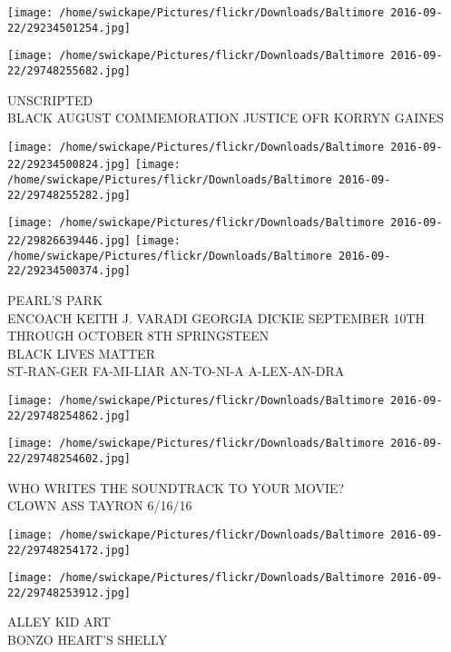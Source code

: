 \documentclass[10pt,letterpaper]{article}
\begin{document}
\texttt{[image: /home/swickape/Pictures/flickr/Downloads/Baltimore 2016-09-22/29234501254.jpg]}

\vspace{0.25in}
\texttt{[image: /home/swickape/Pictures/flickr/Downloads/Baltimore 2016-09-22/29748255682.jpg]}

UNSCRIPTED\\
BLACK AUGUST COMMEMORATION JUSTICE OFR KORRYN GAINES\\
\pagebreak

\texttt{[image: /home/swickape/Pictures/flickr/Downloads/Baltimore 2016-09-22/29234500824.jpg]}
\texttt{[image: /home/swickape/Pictures/flickr/Downloads/Baltimore 2016-09-22/29748255282.jpg]}

\texttt{[image: /home/swickape/Pictures/flickr/Downloads/Baltimore 2016-09-22/29826639446.jpg]}
\texttt{[image: /home/swickape/Pictures/flickr/Downloads/Baltimore 2016-09-22/29234500374.jpg]}

PEARL'S PARK\\
ENCOACH KEITH J. VARADI GEORGIA DICKIE SEPTEMBER 10TH THROUGH OCTOBER 8TH SPRINGSTEEN\\
BLACK LIVES MATTER\\
ST{-}RAN{-}GER FA{-}MI{-}LIAR AN{-}TO{-}NI{-}A A{-}LEX{-}AN{-}DRA\\
\pagebreak

\texttt{[image: /home/swickape/Pictures/flickr/Downloads/Baltimore 2016-09-22/29748254862.jpg]}

\vspace{0.25in}
\texttt{[image: /home/swickape/Pictures/flickr/Downloads/Baltimore 2016-09-22/29748254602.jpg]}

WHO WRITES THE SOUNDTRACK TO YOUR MOVIE?\\
CLOWN ASS TAYRON 6/16/16\\
\pagebreak

\texttt{[image: /home/swickape/Pictures/flickr/Downloads/Baltimore 2016-09-22/29748254172.jpg]}

\vspace{0.25in}
\texttt{[image: /home/swickape/Pictures/flickr/Downloads/Baltimore 2016-09-22/29748253912.jpg]}

ALLEY KID ART\\
BONZO HEART'S SHELLY\\
\pagebreak
\end{document}
